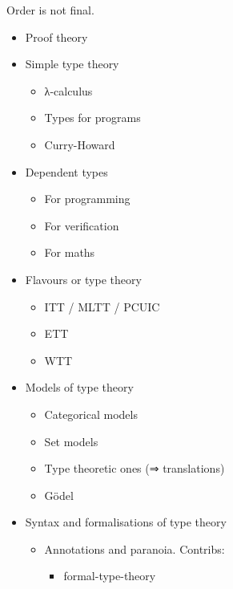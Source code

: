 Order is not final.

\begin{itemize}
  \item Proof theory
  \item Simple type theory
    \begin{itemize}
      \item λ-calculus
      \item Types for programs
      \item Curry-Howard
    \end{itemize}
  \item Dependent types
    \begin{itemize}
      \item For programming
      \item For verification
      \item For maths
    \end{itemize}
  \item Flavours or type theory
    \begin{itemize}
      \item ITT / MLTT / PCUIC
      \item ETT
      \item WTT
    \end{itemize}
  \item Models of type theory
    \begin{itemize}
      \item Categorical models
      \item Set models
      \item Type theoretic ones (⇒ translations)
      \item Gödel
    \end{itemize}
  \item Syntax and formalisations of type theory
    \begin{itemize}
      \item Annotations and paranoia. Contribs:
        \begin{itemize}
          \item formal-type-theory

\end{itemize}
\end{itemize}
\end{itemize}

